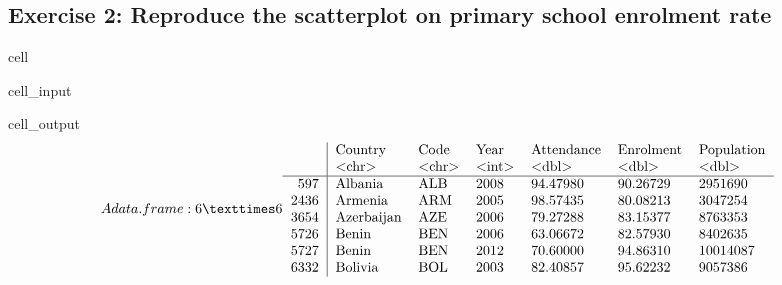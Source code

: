 \documentclass[letterpaper,10pt,english]{jupyterBook}
\begin{document}
\subsection{Exercise 2: Reproduce the scatterplot on primary school enrolment rate}
\label{\detokenize{exercises_unit_4:exercise-2-reproduce-the-scatterplot-on-primary-school-enrolment-rate}}
\begin{sphinxuseclass}{cell}\begin{sphinxVerbatimInput}

\begin{sphinxuseclass}{cell_input}
\begin{sphinxVerbatim}[commandchars=\\\{\}]
\end{sphinxVerbatim}

\end{sphinxuseclass}\end{sphinxVerbatimInput}
\begin{sphinxVerbatimOutput}

\begin{sphinxuseclass}{cell_output}\begin{equation*}
\begin{split}A data.frame: 6 × 6
\begin{tabular}{r|llllll}
  & Country & Code & Year & Attendance & Enrolment & Population\\
  & <chr> & <chr> & <int> & <dbl> & <dbl> & <dbl>\\
\hline
	597 & Albania    & ALB & 2008 & 94.47980 & 90.26729 &  2951690\\
	2436 & Armenia    & ARM & 2005 & 98.57435 & 80.08213 &  3047254\\
	3654 & Azerbaijan & AZE & 2006 & 79.27288 & 83.15377 &  8763353\\
	5726 & Benin      & BEN & 2006 & 63.06672 & 82.57930 &  8402635\\
	5727 & Benin      & BEN & 2012 & 70.60000 & 94.86310 & 10014087\\
	6332 & Bolivia    & BOL & 2003 & 82.40857 & 95.62232 &  9057386\\
\end{tabular}\end{split}
\end{equation*}
\end{sphinxuseclass}\end{sphinxVerbatimOutput}

\end{sphinxuseclass}
\end{document}
